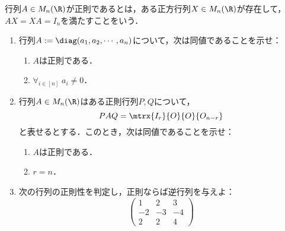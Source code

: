 \documentclass[uplatex,dvipdfmx]{jsarticle}
\begin{document}
\begin{tcolorbox}[colframe=ForestGreen, colback=ForestGreen!10!white,breakable,colbacktitle=ForestGreen!40!white,coltitle=black,fonttitle=\bfseries\sffamily,
    title=第２問]
    \begin{problem}行列$A\in M_n(\R)$が正則であるとは，ある正方行列$X\in M_n(\R)$が存在して，$AX=XA=I_n$を満たすことをいう．
        \begin{enumerate}[{問}1]
            \item 行列$A:=\diag(a_1,a_2,\cdots,a_n)$について，次は同値であることを示せ：
            \begin{enumerate}
                \item $A$は正則である．
                \item $\forall_{i\in[n]}\;a_i\ne0$．
            \end{enumerate}
            \item 行列$A\in M_n(\R)$はある正則行列$P,Q$について，
            \[PAQ=\mtrx{I_r}{O}{O}{O_{n-r}}\]
            と表せるとする．このとき，次は同値であることを示せ：
            \begin{enumerate}
                \item $A$は正則である．
                \item $r=n$．
            \end{enumerate}
            \item 次の行列の正則性を判定し，正則ならば逆行列を与えよ：
            \[\begin{pmatrix}1&2&3\\-2&-3&-4\\2&2&4\end{pmatrix}\]
        \end{enumerate}
    \end{problem}
\end{tcolorbox}
\end{document}
